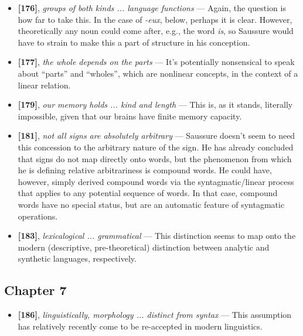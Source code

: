 \documentclass[12pt]{article}
\begin{document}
\begin{itemize}

\item \textbf{[176]}, \textit{groups of both kinds ... language functions} --- Again, the question is how far to take this. In the case of \textit{-eux}, below, perhaps it is clear. However, theoretically any noun could come after, e.g., the word \textit{is}, so Saussure would have to strain to make this a part of structure in his conception.

\item \textbf{[177]}, \textit{the whole depends on the parts} --- It's potentially nonsensical to speak about ``parts'' and ``wholes'', which are nonlinear concepts, in the context of a linear relation. 

\item \textbf{[179]}, \textit{our memory holds ... kind and length} --- This is, as it stands, literally impossible, given that our brains have finite memory capacity.

\item \textbf{[181]}, \textit{not all signs are absolutely arbitrary} --- Saussure doesn't seem to need this concession to the arbitrary nature of the sign. He has already concluded that signs do not map directly onto words, but the phenomenon from which he is defining relative arbitrariness is compound words. He could have, however, simply derived compound words via the syntagmatic/linear process that applies to any potential sequence of words. In that case, compound words have no special status, but are an automatic feature of syntagmatic operations.

\item \textbf{[183]}, \textit{lexicalogical ... grammatical} --- This distinction seems to map onto the modern (descriptive, pre-theoretical)  distinction between analytic and synthetic languages, respectively.

\end{itemize}

\subsection{Chapter 7}

\begin{itemize}

\item \textbf{[186]}, \textit{linguistically, morphology ... distinct from syntax} --- This assumption has relatively recently come to be re-accepted in modern linguistics.

\end{itemize}
\end{document}

